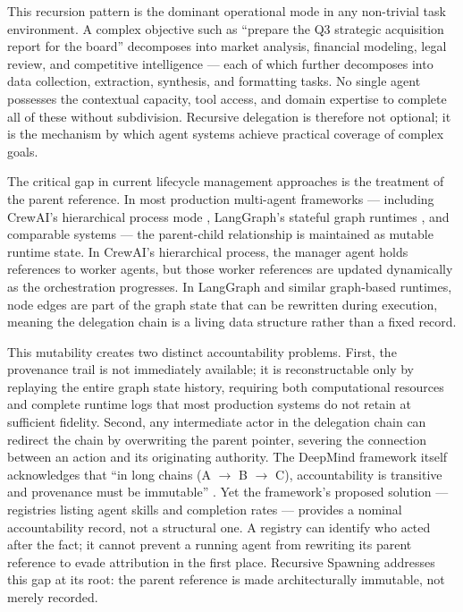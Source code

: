 This recursion pattern is the dominant operational mode in any non-trivial task environment.  A complex objective such as ``prepare the Q3 strategic acquisition report for the board'' decomposes into market analysis, financial modeling, legal review, and competitive intelligence --- each of which further decomposes into data collection, extraction, synthesis, and formatting tasks.  No single agent possesses the contextual capacity, tool access, and domain expertise to complete all of these without subdivision.  Recursive delegation is therefore not optional; it is the mechanism by which agent systems achieve practical coverage of complex goals.

The critical gap in current lifecycle management approaches is the treatment of the parent reference.  In most production multi-agent frameworks --- including CrewAI's hierarchical process mode \cite{zylos2026}, LangGraph's stateful graph runtimes \cite{heavybit2025multiagent}, and comparable systems --- the parent-child relationship is maintained as mutable runtime state.  In CrewAI's hierarchical process, the manager agent holds references to worker agents, but those worker references are updated dynamically as the orchestration progresses.  In LangGraph and similar graph-based runtimes, node edges are part of the graph state that can be rewritten during execution, meaning the delegation chain is a living data structure rather than a fixed record.

This mutability creates two distinct accountability problems.  First, the provenance trail is not immediately available; it is reconstructable only by replaying the entire graph state history, requiring both computational resources and complete runtime logs that most production systems do not retain at sufficient fidelity.  Second, any intermediate actor in the delegation chain can redirect the chain by overwriting the parent pointer, severing the connection between an action and its originating authority.  The DeepMind framework itself acknowledges that ``in long chains (A $\rightarrow$ B $\rightarrow$ C), accountability is transitive and provenance must be immutable'' \cite{intelligent_ai_delegation}.  Yet the framework's proposed solution --- registries listing agent skills and completion rates --- provides a nominal accountability record, not a structural one.  A registry can identify who acted after the fact; it cannot prevent a running agent from rewriting its parent reference to evade attribution in the first place.  Recursive Spawning addresses this gap at its root: the parent reference is made architecturally immutable, not merely recorded.

